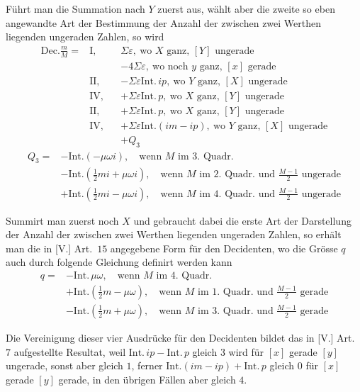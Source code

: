 %
Führt man die Summation nach $Y$ zuerst aus, wählt aber die zweite so eben angewandte Art der Bestimmung der Anzahl der zwischen zwei Werthen liegenden ungeraden Zahlen, so wird
\[
\begin{aligned}
\mathrm{Dec.}\frac mM={}&\mathrm{I},& &\Sigma\varepsilon,\ \text{wo }X\text{ ganz, }[Y]\text{ ungerade}\\
&&&-4\Sigma\varepsilon,\ \text{wo noch }y\text{ ganz, }[x]\text{ gerade}\\
&\mathrm{II},&&-\Sigma\varepsilon\mathrm{Int.}\,ip,\ \text{wo }Y\text{ ganz, }[X]\text{ ungerade}\\
&\mathrm{IV},&&+\Sigma\varepsilon\mathrm{Int.}\,p,\ \text{wo }X\text{ ganz, }[Y]\text{ ungerade}\\
&\mathrm{II},&&+\Sigma\varepsilon\mathrm{Int.}\,p,\ \text{wo }X\text{ ganz, }[Y]\text{ ungerade}\\
&\mathrm{IV},&&+\Sigma\varepsilon\mathrm{Int.}(im-ip),\ \text{wo }Y\text{ ganz, }[X]\text{ ungerade}\\
&&&+Q_3
\end{aligned}
\]
\[
\begin{aligned}
Q_3={}&-\mathrm{Int.}(-\mu\omega i),\quad\text{wenn }M\text{ im }3.\text{ Quadr.}\\
&-\mathrm{Int.}(\tfrac12mi+\mu\omega i),\quad\text{wenn }M\text{ im }2.\text{ Quadr. und }\frac{M-1}{2}\text{ ungerade}\\
&+\mathrm{Int.}(\tfrac12mi-\mu\omega i),\quad\text{wenn }M\text{ im }4.\text{ Quadr. und }\frac{M-1}{2}\text{ ungerade}
\end{aligned}
\]

Summirt man zuerst noch $X$ und gebraucht dabei die erste Art der Darstellung der Anzahl der zwischen zwei Werthen liegenden ungeraden Zahlen, so erhält man die in [V.] Art.\ $15$ angegebene Form für den Decidenten, wo die Grösse $q$ auch durch folgende Gleichung definirt werden kann
\[
\begin{aligned}
q={}&-\mathrm{Int.}\,\mu\omega,\quad\text{wenn }M\text{ im }4.\text{ Quadr.}\\
&+\mathrm{Int.}(\tfrac12m-\mu\omega),\quad\text{wenn }M\text{ im }1.\text{ Quadr. und }\frac{M-1}{2}\text{ gerade}\\
&-\mathrm{Int.}(\tfrac12m+\mu\omega),\quad\text{wenn }M\text{ im }3.\text{ Quadr. und }\frac{M-1}{2}\text{ gerade}
\end{aligned}
\]

Die Vereinigung dieser vier Ausdrücke für den Decidenten bildet das in [V.] Art.\ $7$ aufgestellte Resultat, weil $\mathrm{Int.}\,ip-\mathrm{Int.}\,p$ gleich $3$ wird für $[x]$ gerade $[y]$ ungerade, sonst aber gleich $1$, ferner $\mathrm{Int.}(im-ip)+\mathrm{Int.}\,p$ gleich $0$ für $[x]$ gerade $[y]$ gerade, in den übrigen Fällen aber gleich $4$.

